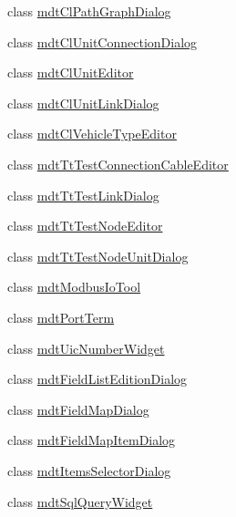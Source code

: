 \begin{DoxyCompactItemize}
class \hyperlink{class_ui_1_1mdt_cl_path_graph_dialog}{mdt\-Cl\-Path\-Graph\-Dialog}
\item 
class \hyperlink{class_ui_1_1mdt_cl_unit_connection_dialog}{mdt\-Cl\-Unit\-Connection\-Dialog}
\item 
class \hyperlink{class_ui_1_1mdt_cl_unit_editor}{mdt\-Cl\-Unit\-Editor}
\item 
class \hyperlink{class_ui_1_1mdt_cl_unit_link_dialog}{mdt\-Cl\-Unit\-Link\-Dialog}
\item 
class \hyperlink{class_ui_1_1mdt_cl_vehicle_type_editor}{mdt\-Cl\-Vehicle\-Type\-Editor}
\item 
class \hyperlink{class_ui_1_1mdt_tt_test_connection_cable_editor}{mdt\-Tt\-Test\-Connection\-Cable\-Editor}
\item 
class \hyperlink{class_ui_1_1mdt_tt_test_link_dialog}{mdt\-Tt\-Test\-Link\-Dialog}
\item 
class \hyperlink{class_ui_1_1mdt_tt_test_node_editor}{mdt\-Tt\-Test\-Node\-Editor}
\item 
class \hyperlink{class_ui_1_1mdt_tt_test_node_unit_dialog}{mdt\-Tt\-Test\-Node\-Unit\-Dialog}
\item 
class \hyperlink{class_ui_1_1mdt_modbus_io_tool}{mdt\-Modbus\-Io\-Tool}
\item 
class \hyperlink{class_ui_1_1mdt_port_term}{mdt\-Port\-Term}
\item 
class \hyperlink{class_ui_1_1mdt_uic_number_widget}{mdt\-Uic\-Number\-Widget}
\item 
class \hyperlink{class_ui_1_1mdt_field_list_edition_dialog}{mdt\-Field\-List\-Edition\-Dialog}
\item 
class \hyperlink{class_ui_1_1mdt_field_map_dialog}{mdt\-Field\-Map\-Dialog}
\item 
class \hyperlink{class_ui_1_1mdt_field_map_item_dialog}{mdt\-Field\-Map\-Item\-Dialog}
\item 
class \hyperlink{class_ui_1_1mdt_items_selector_dialog}{mdt\-Items\-Selector\-Dialog}
\item 
class \hyperlink{class_ui_1_1mdt_sql_query_widget}{mdt\-Sql\-Query\-Widget}
\end{DoxyCompactItemize}
